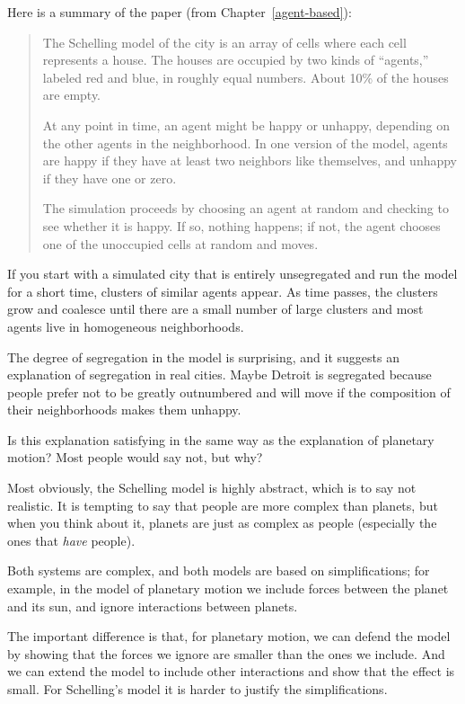 \documentclass[10pt]{book}
\begin{document}
Here is a summary of the paper (from Chapter~\ref{agent-based}):

\begin{quote}
The Schelling model of the city is an array of cells where each cell
represents a house.  The houses are occupied by two kinds of
``agents,'' labeled red and blue, in roughly equal numbers.  About
10\% of the houses are empty.  

At any point in time, an agent might be happy or unhappy, depending
on the other agents in the neighborhood.
In one version of the model, agents are happy if they have at least
two neighbors like themselves, and unhappy if they have one or zero.

The simulation proceeds by choosing an agent at random and checking
to see whether it is happy.  If so, nothing happens; if not,
the agent chooses one of the unoccupied cells at
random and moves.
\end{quote}

If you start with a simulated city that is entirely unsegregated and
run the model for a short time, clusters of similar agents appear.  As
time passes, the clusters grow and coalesce until there are a small
number of large clusters and most agents live in homogeneous
neighborhoods. 

The degree of segregation in the model is surprising, and it suggests
an explanation of segregation in real cities.  Maybe Detroit is
segregated because people prefer not to be greatly outnumbered and
will move if the composition of their neighborhoods makes them
unhappy.   

Is this explanation satisfying in the same way as the explanation of
planetary motion?  Most people would say not, but why?

Most obviously, the Schelling model is highly abstract, which is to
say not realistic.  It is tempting to say that people are more complex
than planets, but when you think about it, planets are just as complex
as people (especially the ones that {\em have} people).

Both systems are complex, and both models are based on
simplifications; for example, in the model of planetary motion we
include forces between the planet and its sun, and ignore interactions
between planets.

The important difference is that, for planetary motion, we can defend
the model by showing that the forces we ignore are smaller than the
ones we include.  And we can extend the model to include other
interactions and show that the effect is small.  For Schelling's model
it is harder to justify the simplifications.
\end{document}
